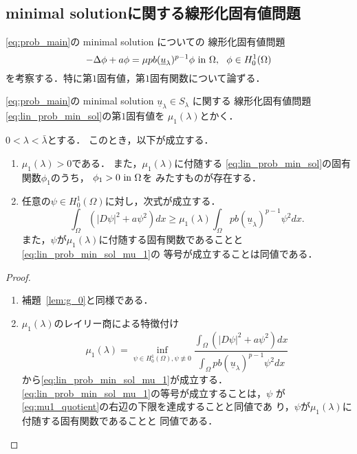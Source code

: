 \subsection{minimal solutionに関する線形化固有値問題}

\ref{eq:prob_main}の minimal solution についての
線形化固有値問題
\begin{equation}
 -\Delta \phi + a \phi = \mu p b (\underline{u}_\lambda)^{p-1} \phi
  ~\text{in}~ \Omega, \ \ \phi \in H_0^1(\Omega) \label{eq:lin_prob_min_sol}
\end{equation}
を考察する．特に第$1$固有値，第$1$固有関数について論ずる．

\begin{nota}
 \ref{eq:prob_main}の
 minimal solution $\underline{u}_\lambda \in S_\lambda$ に関する
 線形化固有値問題\eqref{eq:lin_prob_min_sol}の第$1$固有値を
 $\mu_1(\lambda)$とかく．
\end{nota}

\begin{lem} \label{lem:lin_p}
 $0 < \lambda < \bar{\lambda}$とする．
 このとき，以下が成立する．
 \begin{enumerate}[1.] \sage
  \item $\mu_1(\lambda) > 0$である．
        また，$\mu_1(\lambda)$に付随する
        \eqref{eq:lin_prob_min_sol}の固有関数$\phi_1$のうち，
        $\phi_1 > 0 ~\text{in}~ \Omega$を
        みたすものが存在する．
  \item 任意の$\psi \in H_0^1(\Omega)$に対し，次式が成立する．
        \begin{equation}
         \int_\Omega \left( \lvert D\psi \rvert^2 + a \psi
                      ^2 \right)
          dx \geq \mu_1(\lambda) \int_\Omega pb(\underline{u}_\lambda)^{p-1}
          \psi^2 dx. \label{eq:lin_prob_min_sol_mu_1}
        \end{equation}
        また，$\psi$が$\mu_1(\lambda)$に付随する固有関数であることと
        \eqref{eq:lin_prob_min_sol_mu_1}の
        等号が成立することは同値である．
 \end{enumerate}
\end{lem}

\begin{proof}
 \begin{enumerate}[1.] \sage
  \item 補題~\ref{lem:g_0}と同様である．
  \item $\mu_1(\lambda)$のレイリー商による特徴付け
        \begin{equation}
         \mu_1(\lambda) = \inf_{\psi \in H_0^1(\Omega), \psi \not \equiv 0} 
        \frac{\displaystyle \int_\Omega 
        \left( \left\lvert D\psi \right\rvert^2 + a\psi^2 \right)
          dx }{\displaystyle \int_\Omega pb(\underline{u}_\lambda)^{p-1}
          \psi^2 dx } \label{eq:mu1_quotient}        
        \end{equation}
        から\eqref{eq:lin_prob_min_sol_mu_1}が成立する．
        \eqref{eq:lin_prob_min_sol_mu_1}の等号が成立することは，$\psi$
        が\eqref{eq:mu1_quotient}の右辺の下限を達成することと同値であ
        り，$\psi$が$\mu_1(\lambda)$に付随する固有関数であることと
        同値である．\qedhere
 \end{enumerate}
\end{proof}

